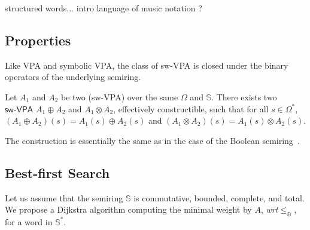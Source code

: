 \documentclass[runningheads]{llncs}
\def\wrt{\textit{wrt}\xspace}
\newcommand{\Semiring}{\mathbb{S}}
\def\SWVPA{\textsf{sw-VPA}\xspace}
\begin{document}
\begin{example}
structured words...
intro language of music notation ?
\end{example}


\subsection{Properties}
Like VPA and symbolic VPA, 
the class of \SWVPA is closed under the binary operators of the underlying semiring.
%
\begin{proposition}
Let $A_1$ and $A_2$ be two (\SWVPA)
over the same $\Omega$ and $\Semiring$.
There exists two $\SWVPA$ $A_1 \oplus A_2$ and $A_1 \otimes A_2$, 
effectively constructible, 
such that for all $s \in \Omega^*$, 
$(A_1 \oplus A_2)(s) = A_1(s) \oplus A_2(s)$ and 
$(A_1 \otimes A_2)(s) = A_1(s) \otimes A_2(s)$.
\end{proposition}
The construction is essentially the same 
as in the case of the Boolean semiring~\cite{dAntonyAlur14SVPDA}.


\subsection{Best-first Search} 
\label{sec:best}\label{sec:search}
Let us assume that the semiring $\Semiring$ is
commutative, bounded, complete, and total.
We propose a Dijkstra algorithm computing the minimal weight by $A$, 
\wrt $\leq_\oplus$, for a word in $\Semiring^*$.
\end{document}
